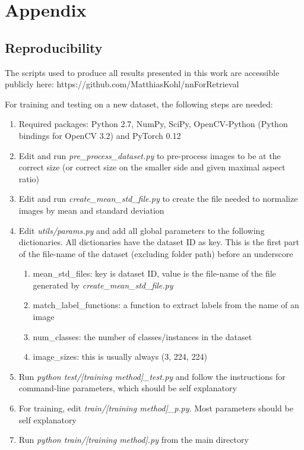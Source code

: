 
\appendix \chapter{Appendix}

\section{Reproducibility}
The scripts used to produce all results presented in this work are accessible
publicly here: https://github.com/MatthiasKohl/nnForRetrieval

For training and testing on a new dataset, the following steps are needed:

\begin{enumerate}
    \item Required packages: Python 2.7, NumPy, SciPy, OpenCV-Python
    (Python bindings for OpenCV 3.2) and PyTorch 0.12
    \item Edit and run \emph{pre_process_dataset.py} to pre-process
    images to be at the correct size (or correct size on the smaller
    side and given maximal aspect ratio)
    \item Edit and run \emph{create_mean_std_file.py} to create the
    file needed to normalize images by mean and standard deviation
    \item Edit \emph{utils/params.py} and add all global parameters
    to the following dictionaries. All dictionaries have the dataset
    ID as key. This is the first part of the file-name of the dataset
    (excluding folder path) before an underscore
    \begin{enumerate}
        \item mean_std_files: key is dataset ID, value is the file-name
        of the file generated by \emph{create_mean_std_file.py}
        \item match_label_functions: a function to extract labels
        from the name of an image
        \item num_classes: the number of classes/instances in the dataset
        \item image_sizes: this is usually always (3, 224, 224)
    \end{enumerate}
    \item Run \emph{python test/[training method]_test.py} and follow
    the instructions for command-line parameters, which should be self
    explanatory
    \item For training, edit \emph{train/[training method]_p.py}.
    Most parameters should be self explanatory
    \item Run \emph{python train/[training method].py} from the main
    directory
\end{enumerate}


